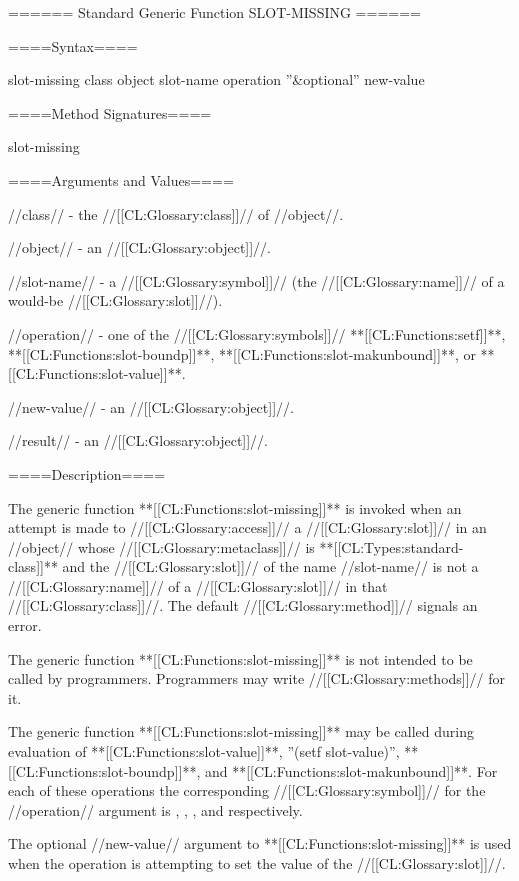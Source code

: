 ====== Standard Generic Function SLOT-MISSING ======

====Syntax====

\DefgenWithValues slot-missing {class object slot-name operation ''&optional'' new-value} {}

====Method Signatures====

\Defmeth slot-missing {}

====Arguments and Values====

//class// - the //[[CL:Glossary:class]]// of //object//.

//object// - an //[[CL:Glossary:object]]//.

//slot-name// - a //[[CL:Glossary:symbol]]// (the //[[CL:Glossary:name]]// of a would-be //[[CL:Glossary:slot]]//).

//operation// - one of the //[[CL:Glossary:symbols]]// **[[CL:Functions:setf]]**, **[[CL:Functions:slot-boundp]]**, **[[CL:Functions:slot-makunbound]]**, or **[[CL:Functions:slot-value]]**.

//new-value// - an //[[CL:Glossary:object]]//.

//result// - an //[[CL:Glossary:object]]//.

====Description====

The generic function **[[CL:Functions:slot-missing]]** is invoked when an attempt is made to //[[CL:Glossary:access]]// a //[[CL:Glossary:slot]]// in an //object// whose //[[CL:Glossary:metaclass]]// is **[[CL:Types:standard-class]]** and the //[[CL:Glossary:slot]]// of the name //slot-name// is not a //[[CL:Glossary:name]]// of a //[[CL:Glossary:slot]]// in that //[[CL:Glossary:class]]//. The default //[[CL:Glossary:method]]// signals an error.

The generic function **[[CL:Functions:slot-missing]]** is not intended to be called by programmers. Programmers may write //[[CL:Glossary:methods]]// for it.

The generic function **[[CL:Functions:slot-missing]]** may be called during evaluation of **[[CL:Functions:slot-value]]**, ''(setf slot-value)'', **[[CL:Functions:slot-boundp]]**, and **[[CL:Functions:slot-makunbound]]**. For each of these operations the corresponding //[[CL:Glossary:symbol]]// for the //operation// argument is , , , and  respectively.

The optional //new-value// argument to **[[CL:Functions:slot-missing]]** is used when the operation is attempting to set the value of the //[[CL:Glossary:slot]]//.


